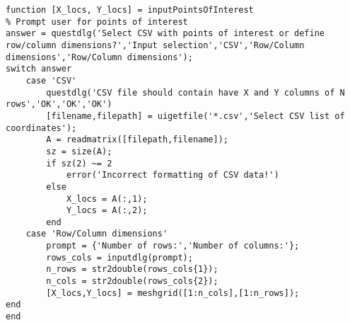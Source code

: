 \begin{lstlisting}
function [X_locs, Y_locs] = inputPointsOfInterest
% Prompt user for points of interest
answer = questdlg('Select CSV with points of interest or define row/column dimensions?','Input selection','CSV','Row/Column dimensions','Row/Column dimensions');
switch answer
    case 'CSV'
        questdlg('CSV file should contain have X and Y columns of N rows','OK','OK','OK')
        [filename,filepath] = uigetfile('*.csv','Select CSV list of coordinates');
        A = readmatrix([filepath,filename]);
        sz = size(A);
        if sz(2) ~= 2
            error('Incorrect formatting of CSV data!')
        else
            X_locs = A(:,1);
            Y_locs = A(:,2);
        end
    case 'Row/Column dimensions'
        prompt = {'Number of rows:','Number of columns:'};
        rows_cols = inputdlg(prompt);
        n_rows = str2double(rows_cols{1});
        n_cols = str2double(rows_cols{2});
        [X_locs,Y_locs] = meshgrid([1:n_cols],[1:n_rows]);
end
end


\end{lstlisting}